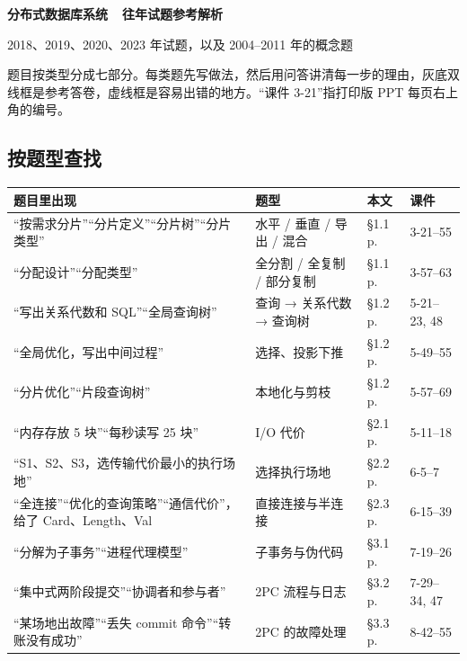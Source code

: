 \documentclass[10pt,a4paper]{article}
\begin{document}
\thispagestyle{empty}
\begin{center}
{\sffamily\bfseries\LARGE 分布式数据库系统\ \ 往年试题参考解析}\par\vspace{3pt}
{\small 2018、2019、2020、2023 年试题，以及 2004–2011 年的概念题}
\end{center}

{\small 题目按类型分成七部分。每类题先写做法，然后用问答讲清每一步的理由，灰底双线框是参考答卷，虚线框是容易出错的地方。“课件 3-21”指打印版 PPT 每页右上角的编号。}

\subsection*{按题型查找}
\vspace{-2pt}
{\small
\renewcommand{\arraystretch}{1.05}
\begin{tabularx}{\linewidth}{@{}>{\raggedright\arraybackslash}X >{\raggedright\arraybackslash}p{3.7cm} l l@{}}
\toprule
\textbf{题目里出现} & \textbf{题型} & \textbf{本文} & \textbf{课件} \\
\midrule
“按需求分片”“分片定义”“分片树”“分片类型” & 水平 / 垂直 / 导出 / 混合 & \S1.1\,p.\pageref{s:frag} & 3-21--55 \\
“分配设计”“分配类型” & 全分割 / 全复制 / 部分复制 & \S1.1\,p.\pageref{s:frag} & 3-57--63 \\
“写出关系代数和 SQL”“全局查询树” & 查询 → 关系代数 → 查询树 & \S1.2\,p.\pageref{s:opt} & 5-21--23, 48 \\
“全局优化，写出中间过程” & 选择、投影下推 & \S1.2\,p.\pageref{s:opt} & 5-49--55 \\
“分片优化”“片段查询树” & 本地化与剪枝 & \S1.2\,p.\pageref{s:opt} & 5-57--69 \\
“内存存放 5 块”“每秒读写 25 块” & I/O 代价 & \S2.1\,p.\pageref{s:io} & 5-11--18 \\
“S1、S2、S3，选传输代价最小的执行场地” & 选择执行场地 & \S2.2\,p.\pageref{s:site} & 6-5--7 \\
“全连接”“优化的查询策略”“通信代价”，给了 Card、Length、Val & 直接连接与半连接 & \S2.3\,p.\pageref{s:semi} & 6-15--39 \\
“分解为子事务”“进程代理模型” & 子事务与伪代码 & \S3.1\,p.\pageref{s:proc} & 7-19--26 \\
“集中式两阶段提交”“协调者和参与者” & 2PC 流程与日志 & \S3.2\,p.\pageref{s:2pc} & 7-29--34, 47 \\
“某场地出故障”“丢失 commit 命令”“转账没有成功” & 2PC 的故障处理 & \S3.3\,p.\pageref{s:fail} & 8-42--55 \\

\end{tabularx}}
\end{document}
